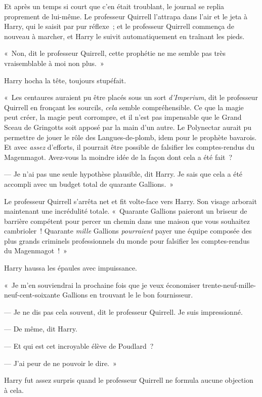 Et après un temps si court que c'en était troublant, le journal se replia proprement de lui-même.
Le professeur Quirrell l'attrapa dans l'air et le jeta à Harry, qui le saisit par pur réflexe~; et le professeur Quirrell commença de nouveau à marcher, et Harry le suivit automatiquement en traînant les pieds.

«~Non, dit le professeur Quirrell, cette prophétie ne me semble pas très vraisemblable à moi non plus.~»

Harry hocha la tête, toujours stupéfait.

«~Les centaures auraient pu être placés sous un sort \emph{d'Imperium}, dit le professeur Quirrell en fronçant les sourcils, \emph{cela} semble compréhensible.
Ce que la magie peut créer, la magie peut corrompre, et il n'est pas impensable que le Grand Sceau de Gringotts soit apposé par la main d'un autre.
Le Polynectar aurait pu permettre de jouer le rôle des Langues-de-plomb, idem pour le prophète bavarois.
Et avec \emph{assez} d'efforts, il pourrait être possible de falsifier les comptes-rendus du Magenmagot.
Avez-vous la moindre idée de la façon dont cela a été fait~?

--- Je n'ai pas une seule hypothèse plausible, dit Harry.
Je sais que cela a été accompli avec un budget total de quarante Gallions.~»

Le professeur Quirrell s'arrêta net et fit volte-face vers Harry.
Son visage arborait maintenant une incrédulité totale.
«~Quarante Gallions paieront un briseur de barrière compétent pour percer un chemin dans une maison que vous souhaitez cambrioler~!
Quarante \emph{mille} Gallions \emph{pourraient} payer une équipe composée des plus grands criminels professionnels du monde pour falsifier les comptes-rendus du Magenmagot~!~»

Harry haussa les épaules avec impuissance.

«~Je m'en souviendrai la prochaine fois que je veux économiser trente-neuf-mille-neuf-cent-soixante Gallions en trouvant le le bon fournisseur.

--- Je ne dis pas cela souvent, dit le professeur Quirrell.
Je suis impressionné.

--- De même, dit Harry.

--- Et qui est cet incroyable élève de Poudlard~?

--- J'ai peur de ne pouvoir le dire.~»

Harry fut assez surpris quand le professeur Quirrell ne formula aucune objection à cela.

